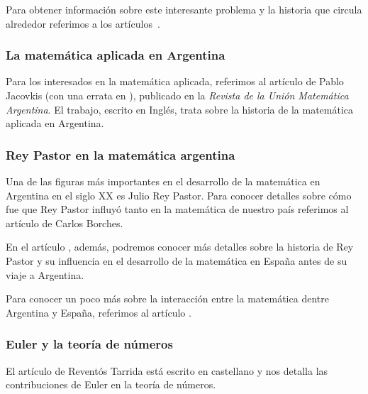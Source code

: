 Para obtener información sobre este interesante problema y la historia
que circula alrededor referimos a
los artículos~\cite{MR1513794,MR1875156,MR1238181,MR1614879,MR1344311}.

\subsubsection*{La matemática aplicada en Argentina}

Para los interesados en la matemática aplicada, referimos al artículo
\cite{MR2504537} 
de Pablo Jacovkis (con una errata en \cite{MR2500178}), publicado
en la \emph{Revista de la Unión Matemática Argentina}. 
El trabajo, escrito en Inglés, 
trata sobre la historia de la matemática aplicada en Argentina.  

\subsubsection*{Rey Pastor en la matemática argentina}

Una de las figuras más importantes en el desarrollo de la matemática
en Argentina en el siglo XX es Julio Rey Pastor. Para conocer
detalles sobre cómo fue que Rey Pastor influyó tanto en la matemática
de nuestro país referimos al artículo 
\cite{THAA4111} de Carlos Borches. 

En el artículo \cite{zbMATH05139177}, además, podremos conocer
más detalles sobre la historia 
de Rey Pastor
y su influencia en el desarrollo de la matemática en España antes de su viaje a 
Argentina. 

Para conocer un poco más sobre la interacción entre la matemática
dentre Argentina y España, referimos al artículo \cite{zbMATH06696384}. 

\subsubsection*{Euler y la teoría de números}

El artículo \cite{zbMATH05763410} de 
Revent{\'o}s Tarrida está escrito en castellano y nos detalla
las contribuciones de Euler en la teoría de números. 



